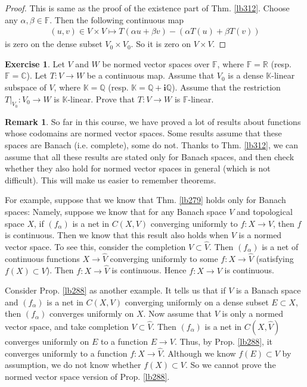 \documentclass[12pt,b5paper,notitlepage]{article}
\theoremstyle{definition}
\newtheorem{exe}[df]{Exercise}
\newtheorem{rem}[df]{Remark}
\theoremstyle{plain}
\newcommand{\wht}{\widehat}
\newcommand{\im}{\mathbf{i}}
\newcommand{\Kbb}{\mathbb K}
\newcommand{\Cbb}{\mathbb C}
\newcommand{\Qbb}{\mathbb Q}
\newcommand{\Rbb}{\mathbb R}
\newcommand{\Fbb}{\mathbb F}
\numberwithin{equation}{section}
\begin{document}
\begin{proof}
This is same as the proof of the existence part of Thm. \ref{lb312}. Choose any $\alpha,\beta\in\Fbb$. Then the following continuous map
\begin{gather*}
(u,v)\in V\times V\mapsto T(\alpha u+\beta v)-(\alpha T(u)+\beta T(v))
\end{gather*}
is zero on the dense subset $V_0\times V_0$. So it is zero on $V\times V$.
\end{proof}


\begin{exe}
Let $V$ and $W$ be normed vector spaces over $\Fbb$, where $\Fbb=\Rbb$ (resp. $\Fbb=\Cbb$). Let $T:V\rightarrow W$ be a continuous map. Assume that $V_0$ is a dense $\Kbb$-linear subspace of $V$, where $\Kbb=\Qbb$ (resp. $\Kbb=\Qbb+\im\Qbb$). Assume that the restriction $T|_{V_0}:V_0\rightarrow W$ is $\Kbb$-linear. Prove that $T:V\rightarrow W$ is $\Fbb$-linear.
\end{exe}


\begin{rem}\label{lb538}
So far in this course, we have proved a lot of results about functions whose codomains are normed vector spaces. Some results assume that these spaces are Banach (i.e. complete), some do not. Thanks to Thm. \ref{lb312}, we can assume that all these results are stated only for Banach spaces, and then check whether they also hold for normed vector spaces in general (which is not difficult). This will make us easier to remember theorems.

For example, suppose that we know that Thm. \ref{lb279} holds only for Banach spaces: Namely, suppose we know that for any Banach space $V$ and topological space $X$, if $(f_\alpha)$ is a net in $C(X,V)$ converging uniformly to $f:X\rightarrow V$, then $f$ is continuous. Then we know that this result also holds when $V$ is a normed vector space. To see this, consider the completion $V\subset\wht V$. Then $(f_\alpha)$ is a net of continuous functions $X\rightarrow\wht V$ converging uniformly to some $f:X\rightarrow \wht V$ (satisfying $f(X)\subset V$). Then $f:X\rightarrow\wht V$ is continuous. Hence $f:X\rightarrow V$ is continuous.

Consider Prop. \ref{lb288} as another example. It tells us that if $V$ is a Banach space and $(f_\alpha)$ is a net in $C(X,V)$ converging uniformly on a dense subset $E\subset X$, then $(f_\alpha)$ converges uniformly on $X$. Now assume that $V$ is only a normed vector space, and take completion $V\subset\wht V$. Then $(f_\alpha)$ is a net in $C(X,\wht V)$ converges uniformly on $E$ to a function $E\rightarrow V$. Thus, by Prop. \ref{lb288}, it converges uniformly to a function $f:X\rightarrow\wht V$. Although we know $f(E)\subset V$ by assumption, we do not know whether $f(X)\subset V$. So we cannot prove the normed vector space version of Prop. \ref{lb288}.  \hfill\qedsymbol 
\end{rem}
\end{document}
